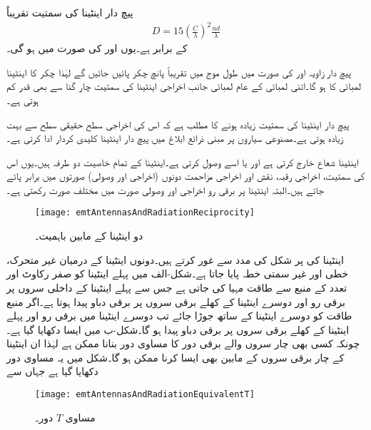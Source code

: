پیچ دار اینٹینا کی سمتیت تقریباً
\begin{align}
D=15 \left(\frac{C}{\lambda}\right)^2 \frac{n d}{\lambda}
\end{align}
کے برابر ہے۔یوں  اور  کی صورت میں  ہو گی۔

پیچ دار زاویہ  اور  کی صورت میں طول موج میں تقریباً پانچ چکر پائیں جائیں گے لہٰذا  چکر کا
 اینٹینا  لمبائی کا ہو گا۔اتنی لمبائی کے عام لمبائی جانب اخراجی اینٹینا کی سمتیت چار گنا سے بھی قدر کم ہوتی ہے۔

پیچ دار اینٹینا کی سمتیت زیادہ ہونے کا مطلب ہے کہ اس کی اخراجی سطح حقیقی سطح سے بہت زیادہ ہوتی ہے۔مصنوعی سیاروں پر مبنی ذرائع ابلاغ میں پیچ دار اینٹینا کلیدی کردار ادا کرتی ہے۔ 

اینٹینا شعاع خارج کرتی ہے اور یا اسے وصول کرتی ہے۔اینٹینا کے تمام خاصیت دو طرفہ ہیں۔یوں اس کی سمتیت، اخراجی رقبہ، نقش اور اخراجی مزاحمت دونوں (اخراجی اور وصولی) صورتوں  میں برابر پائے جاتے ہیں۔البتہ اینٹینا پر برقی رو اخراجی اور وصولی صورت میں مختلف صورت رکھتی ہے۔

\begin{figure}
\centering
\texttt{[image: emtAntennasAndRadiationReciprocity]}
\caption{دو اینٹینا کے مابین باہمیت۔}
\label{شکل_اینٹینا_باہمیت}
\end{figure}
اینٹینا کی  پر شکل  کی مدد سے غور کرتے ہیں۔دونوں اینٹینا کے درمیان غیر متحرک، خطی اور غیر سمتی خطہ پایا جاتا ہے۔شکل-الف میں پہلے اینٹینا کو صفر رکاوٹ اور  تعدد کے منبع سے طاقت مہیا کی جاتی ہے جس سے پہلے اینٹینا کے داخلی سروں پر  برقی رو اور دوسرے اینٹینا کے کھلے برقی سروں پر برقی دباو  پیدا ہوتا ہے۔اگر منبع طاقت کو دوسرے اینٹینا کے ساتھ جوڑا جائے تب دوسرے اینٹینا میں  برقی رو اور پہلے اینٹینا کے کھلے برقی سروں پر  برقی دباو پیدا ہو گا۔شکل-ب میں ایسا دکھایا گیا ہے۔چونکہ کسی بھی چار سروں والے برقی دور کا مساوی  دور بنانا ممکن ہے لہٰذا ان اینٹینا کے چار برقی سروں کے مابین بھی ایسا کرنا ممکن ہو گا۔شکل  میں یہ مساوی دور دکھایا گیا ہے جہاں سے

\begin{figure}
\centering
\texttt{[image: emtAntennasAndRadiationEquivalentT]}
\caption{مساوی $T$ دور۔}
\label{شکل_اینٹینا_مساوی_ٹی_دور}
\end{figure}

